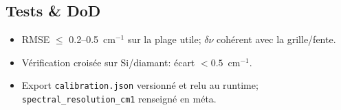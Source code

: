 \subsection{Tests \& DoD}
\begin{itemize}[nosep]
\item RMSE $\le$ 0.2--0.5~cm$^{-1}$ sur la plage utile; $\delta \nu$ cohérent avec la grille/fente.
\item Vérification croisée sur Si/diamant: écart $<0.5$~cm$^{-1}$.
\item Export \texttt{calibration.json} versionné et relu au runtime; \texttt{spectral\_resolution\_cm1} renseigné en méta.
\end{itemize}
